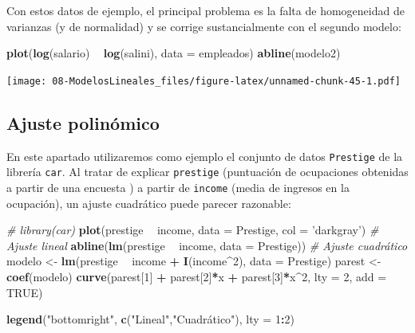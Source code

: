 \documentclass[]{book}
\newenvironment{Shaded}{\begin{snugshade}}{\end{snugshade}}
\newcommand{\KeywordTok}[1]{\textcolor[rgb]{0.13,0.29,0.53}{\textbf{#1}}}
\newcommand{\DataTypeTok}[1]{\textcolor[rgb]{0.13,0.29,0.53}{#1}}
\newcommand{\DecValTok}[1]{\textcolor[rgb]{0.00,0.00,0.81}{#1}}
\newcommand{\StringTok}[1]{\textcolor[rgb]{0.31,0.60,0.02}{#1}}
\newcommand{\CommentTok}[1]{\textcolor[rgb]{0.56,0.35,0.01}{\textit{#1}}}
\newcommand{\OtherTok}[1]{\textcolor[rgb]{0.56,0.35,0.01}{#1}}
\newcommand{\OperatorTok}[1]{\textcolor[rgb]{0.81,0.36,0.00}{\textbf{#1}}}
\newcommand{\NormalTok}[1]{#1}
\begin{document}
Con estos datos de ejemplo, el principal problema es la falta de
homogeneidad de varianzas (y de normalidad) y se corrige sustancialmente
con el segundo modelo:

\begin{Shaded}
\begin{Highlighting}[]
\KeywordTok{plot}\NormalTok{(}\KeywordTok{log}\NormalTok{(salario) }\OperatorTok{~}\StringTok{ }\KeywordTok{log}\NormalTok{(salini), }\DataTypeTok{data =}\NormalTok{ empleados)}
\KeywordTok{abline}\NormalTok{(modelo2)}
\end{Highlighting}
\end{Shaded}

\texttt{[image: 08-ModelosLineales\_files/figure-latex/unnamed-chunk-45-1.pdf]}

\subsection{Ajuste polinómico}\label{ajuste-polinomico}

En este apartado utilizaremos como ejemplo el conjunto de datos
\texttt{Prestige} de la librería \texttt{car}. Al tratar de explicar
\texttt{prestige} (puntuación de ocupaciones obtenidas a partir de una
encuesta ) a partir de \texttt{income} (media de ingresos en la
ocupación), un ajuste cuadrático puede parecer razonable:

\begin{Shaded}
\begin{Highlighting}[]
\CommentTok{# library(car)}
\KeywordTok{plot}\NormalTok{(prestige }\OperatorTok{~}\StringTok{ }\NormalTok{income, }\DataTypeTok{data =}\NormalTok{ Prestige, }\DataTypeTok{col =} \StringTok{'darkgray'}\NormalTok{)}
\CommentTok{# Ajuste lineal}
\KeywordTok{abline}\NormalTok{(}\KeywordTok{lm}\NormalTok{(prestige }\OperatorTok{~}\StringTok{ }\NormalTok{income, }\DataTypeTok{data =}\NormalTok{ Prestige)) }
\CommentTok{# Ajuste cuadrático}
\NormalTok{modelo <-}\StringTok{ }\KeywordTok{lm}\NormalTok{(prestige }\OperatorTok{~}\StringTok{ }\NormalTok{income }\OperatorTok{+}\StringTok{ }\KeywordTok{I}\NormalTok{(income}\OperatorTok{^}\DecValTok{2}\NormalTok{), }\DataTypeTok{data =}\NormalTok{ Prestige)}
\NormalTok{parest <-}\StringTok{ }\KeywordTok{coef}\NormalTok{(modelo)}
\KeywordTok{curve}\NormalTok{(parest[}\DecValTok{1}\NormalTok{] }\OperatorTok{+}\StringTok{ }\NormalTok{parest[}\DecValTok{2}\NormalTok{]}\OperatorTok{*}\NormalTok{x }\OperatorTok{+}\StringTok{ }\NormalTok{parest[}\DecValTok{3}\NormalTok{]}\OperatorTok{*}\NormalTok{x}\OperatorTok{^}\DecValTok{2}\NormalTok{, }\DataTypeTok{lty =} \DecValTok{2}\NormalTok{, }\DataTypeTok{add =} \OtherTok{TRUE}\NormalTok{)}

\KeywordTok{legend}\NormalTok{(}\StringTok{"bottomright"}\NormalTok{, }\KeywordTok{c}\NormalTok{(}\StringTok{"Lineal"}\NormalTok{,}\StringTok{"Cuadrático"}\NormalTok{), }\DataTypeTok{lty =} \DecValTok{1}\OperatorTok{:}\DecValTok{2}\NormalTok{)}
\end{Highlighting}
\end{Shaded}
\end{document}
